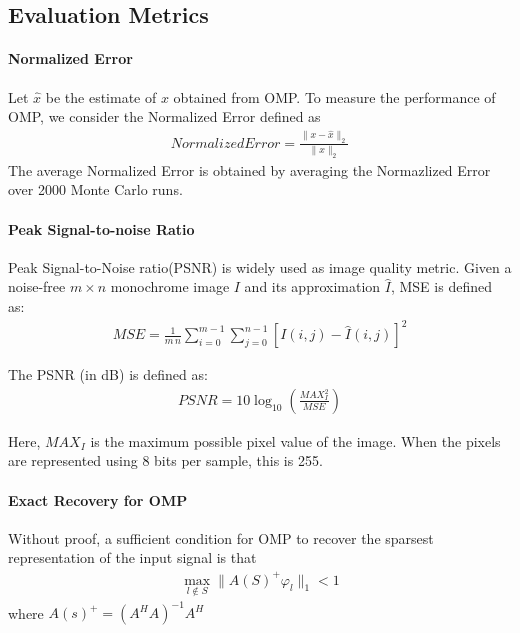 \documentclass{ucsdreport}
\begin{document}
\subsection{Evaluation Metrics}
\paragraph{Normalized Error} Let $\hat{x}$ be the estimate of $x$ obtained from OMP. To measure the performance of OMP, we consider the Normalized Error defined as
\begin{align*}
    Normalized Error = \frac{\|x - \hat{x}\|_2}{\|x\|_2}
\end{align*}
The average Normalized Error is obtained by averaging the Normazlized Error over 2000 Monte Carlo runs.

\paragraph{Peak Signal-to-noise Ratio}Peak Signal-to-Noise ratio(PSNR) is widely used as image quality metric. Given a noise-free $m\times n$ monochrome image $I$ and its approximation $\hat{I}$, MSE is defined as:
\begin{align*}
    {MSE}={\frac {1}{m\,n}\sum _{i=0}^{m-1}\sum _{j=0}^{n-1}[I(i,j)-\hat{I}(i,j)]^{2}}
\end{align*}

The PSNR (in dB) is defined as:
\begin{align*}
    PSNR = 10\log_{10}(\frac{MAX_I^2}{MSE})
\end{align*}

Here, $MAX_I$ is the maximum possible pixel value of the image. When the pixels are represented using 8 bits per sample, this is 255. 

\paragraph{Exact Recovery for OMP} Without proof, a sufficient condition for OMP to recover the sparsest representation of the input signal is that
\begin{align*}
    \max_{l \not\in S }\|A(S)^+ \varphi_l\|_1<1
\end{align*}
where $A(s)^+ = (A^HA)^{-1}A^H$
\end{document}
